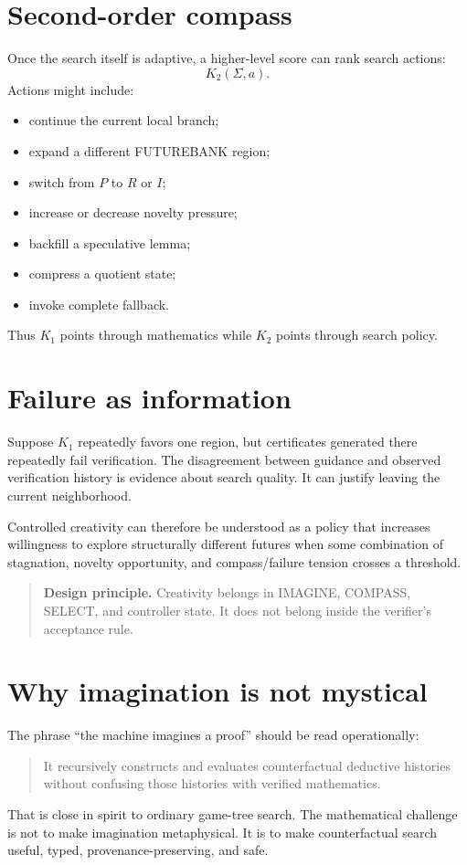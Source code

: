 \documentclass[11pt,openany]{book}
\theoremstyle{definition}
\theoremstyle{remark}
\newenvironment{designbox}{\begin{quote}\small\color{green!35!black}\textbf{Design principle.} }{\end{quote}}
\newcommand{\State}{\Sigma}
\begin{document}
\section{Second-order compass}
Once the search itself is adaptive, a higher-level score can rank search actions:
\[
K_2(\State,a).
\]
Actions might include:
\begin{itemize}
\item continue the current local branch;
\item expand a different FUTUREBANK region;
\item switch from $P$ to $R$ or $I$;
\item increase or decrease novelty pressure;
\item backfill a speculative lemma;
\item compress a quotient state;
\item invoke complete fallback.
\end{itemize}
Thus $K_1$ points through mathematics while $K_2$ points through search policy.

\section{Failure as information}
Suppose $K_1$ repeatedly favors one region, but certificates generated there repeatedly fail verification. The disagreement between guidance and observed verification history is evidence about search quality. It can justify leaving the current neighborhood.

Controlled creativity can therefore be understood as a policy that increases willingness to explore structurally different futures when some combination of stagnation, novelty opportunity, and compass/failure tension crosses a threshold.

\begin{designbox}
Creativity belongs in IMAGINE, COMPASS, SELECT, and controller state. It does not belong inside the verifier's acceptance rule.
\end{designbox}

\section{Why imagination is not mystical}
The phrase ``the machine imagines a proof'' should be read operationally:
\begin{quote}
It recursively constructs and evaluates counterfactual deductive histories without confusing those histories with verified mathematics.
\end{quote}
That is close in spirit to ordinary game-tree search. The mathematical challenge is not to make imagination metaphysical. It is to make counterfactual search useful, typed, provenance-preserving, and safe.
\end{document}
